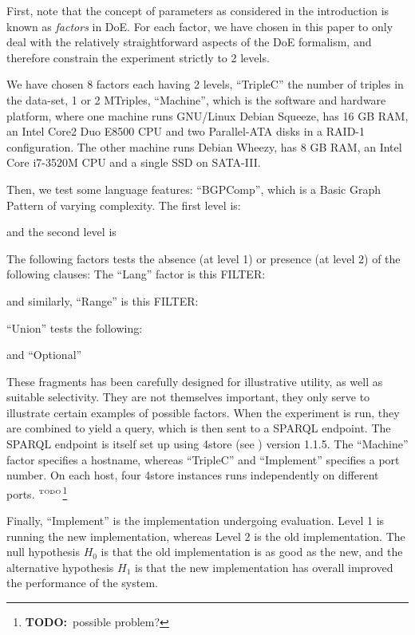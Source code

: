 \documentclass{llncs}
\newcommand{\todo}[1]{\ensuremath{^{\textrm{\tiny{TODO}\normalsize}}}\footnote{\textbf{TODO:}~#1}}
\begin{document}
First, note that the concept of parameters as considered in the
introduction is known as \emph{factors} in DoE. For each factor, we
have chosen in this paper to only deal with the relatively
straightforward aspects of the DoE formalism, and therefore 
constrain the experiment strictly to 2 levels.

We have chosen 8 factors each having 2 levels, ``TripleC'' the number of triples in the
data-set, 1 or 2 MTriples, ``Machine'', which is the software and hardware platform,
where one machine runs GNU/Linux Debian Squeeze, has 16 GB RAM, an
Intel Core2 Duo E8500 CPU and two Parallel-ATA disks in a RAID-1
configuration. The other machine runs Debian Wheezy, has 8 GB RAM, an
Intel Core i7-3520M CPU and a single SSD on SATA-III. 

Then, we test some language features: 
``BGPComp'', which is a Basic Graph Pattern of varying complexity. The
first level is:

and the second level is 


The following factors tests the absence (at level 1) or presence (at level 2) of the following clauses:
The ``Lang'' factor is this FILTER:

and similarly,  ``Range'' is this FILTER:

``Union'' tests the following:

and ``Optional''


These fragments has been carefully designed for illustrative utility,
as well as suitable selectivity. They are not themselves important,
they only serve to illustrate certain examples of possible
factors. When the experiment is run, they are combined to yield a
query, which is then sent to a SPARQL endpoint. The SPARQL endpoint is
itself set up using 4store (see \cite{harris20094store}) version
1.1.5. The ``Machine'' factor specifies a hostname, whereas
``TripleC'' and ``Implement'' specifies a port number. On each host,
four 4store instances runs independently on different
ports. \todo{possible problem?}

Finally, ``Implement'' is the implementation undergoing
evaluation. Level 1 is running the new implementation, whereas Level 2
is the old implementation. The null hypothesis $H_0$ is that the old
implementation is as good as the new, and the alternative hypothesis
$H_1$ is that the new implementation has overall improved the
performance of the system.
\end{document}
